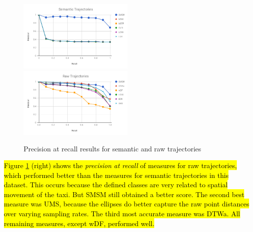 \documentclass[12pt]{article}
\begin{document}
\begin{figure}[ht!]
\centering
\centerline{
\includegraphics[width=0.5\textwidth]{Images/P_R-chart_San_Francisco.png}
\includegraphics[width=0.5\textwidth]{Images/P_R-chart_San_Francisco-raw.png}
}
\caption{ Precision at recall results for semantic and raw trajectories}
\label{fig:sanfrancisco_precision_recall}
\end{figure}



\hl{Figure {\ref{fig:sanfrancisco_precision_recall}} (right) shows the \emph{precision at recall} of measures for raw trajectories, which performed better than the measures for semantic trajectories in this dataset. This occurs because the defined classes are very related to spatial movement of the taxi. But SMSM still obtained a better score. The second best measure was UMS, because the ellipses do better capture the raw point distances over varying sampling rates. The third most accurate measure was DTWa.  
All remaining measures, except wDF, performed well.
}
\end{document}

